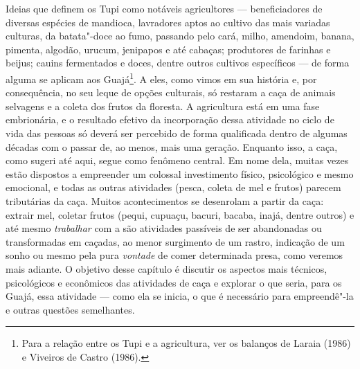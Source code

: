 \noindent Ideias que definem os Tupi como notáveis agricultores --- beneficiadores
de diversas espécies de mandioca, lavradores aptos ao cultivo das mais
variadas culturas, da batata"-doce ao fumo, passando pelo cará, milho,
amendoim, banana, pimenta, algodão, urucum, jenipapos e até cabaças;
produtores de farinhas e beijus; cauins fermentados e doces, dentre
outros cultivos específicos --- de forma alguma se aplicam aos
Guajá\footnote{Para a relação entre os Tupi e a agricultura, ver os
  balanços de Laraia (1986) e Viveiros de Castro (1986).}. A eles, como
vimos em sua história e, por consequência, no seu leque de opções
culturais, só restaram a caça de animais selvagens e a coleta dos frutos
da floresta. A agricultura está em uma fase embrionária, e o resultado
efetivo da incorporação dessa atividade no ciclo de vida das pessoas só
deverá ser percebido de forma qualificada dentro de algumas décadas com
o passar de, ao menos, mais uma geração. Enquanto isso, a caça, como
sugeri até aqui, segue como fenômeno central. Em nome dela, muitas vezes
estão dispostos a empreender um colossal investimento físico,
psicológico e mesmo emocional, e todas as outras atividades (pesca,
coleta de mel e frutos) parecem tributárias da caça. Muitos
acontecimentos se desenrolam a partir da caça: extrair mel, coletar
frutos (pequi, cupuaçu, bacuri, bacaba, inajá, dentre outros) e até
mesmo \emph{trabalhar} com a  são atividades passíveis de ser
abandonadas ou transformadas em caçadas, ao menor surgimento de um
rastro, indicação de um sonho ou mesmo pela pura \emph{vontade} de comer
determinada presa, como veremos mais adiante. O objetivo desse capítulo
é discutir os aspectos mais técnicos, psicológicos e econômicos das
atividades de caça e explorar o que seria, para os Guajá, essa atividade
--- como ela se inicia, o que é necessário para empreendê"-la e outras
questões semelhantes.

